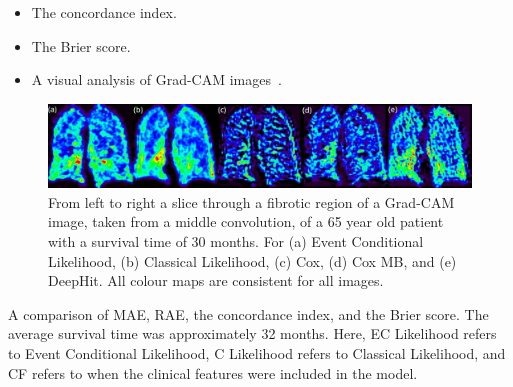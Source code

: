 \documentclass[landscape, color=UCLburgundy, margin=1cm]{uclposter}
\begin{document}
\begin{multicols}{2}
\begin{multicols}{2}
\begin{itemize}
\begin{itemize}
                            \item The concordance index.
                            
                            \item The Brier score.
                            
                            \item A visual analysis of Grad-CAM images~\cite{Selvaraju2020Grad-CAM:Localization}.
                        \end{itemize}
                    \end{itemize}
        \end{multicols}
    
        \begin{figure}[H]
            \centering
    
            \includegraphics[width=1.0\linewidth]{grad_cam_label.png}
            
            \captionsetup{singlelinecheck=false, justification=centering}
            \begin{highlightbox}[UCLlightblue]
                \caption{
                    From left to right a slice through a fibrotic region of a Grad-CAM image, taken from a middle convolution, of a 65 year old patient with a survival time of 30 months. For (a) Event Conditional Likelihood, (b) Classical Likelihood, (c) Cox, (d) Cox \gls{MB}, and (e) DeepHit. All colour maps are consistent for all images.
                }
            \end{highlightbox}
        \end{figure}
    
        \begin{multicols}{2}
            \begin{table}[H]
                \centering
                
                \captionsetup{singlelinecheck=false, justification=centering}
                \begin{highlightbox}[UCLlightblue]
                    \caption{
                        A comparison of \gls{MAE}, \gls{RAE}, the concordance index, and the Brier score. The average survival time was approximately 32 months. Here, EC Likelihood refers to Event Conditional Likelihood, C Likelihood refers to Classical Likelihood, and CF refers to when the clinical features were included in the model.
                    }
                \end{highlightbox}
                

\end{table}
\end{multicols}
\end{multicols}
\end{document}
